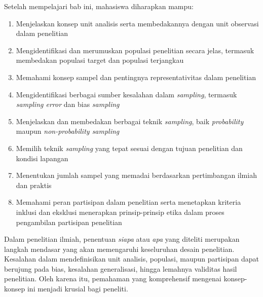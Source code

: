 \documentclass[
  indonesian,
  letterpaper,
  DIV=11,
  numbers=noendperiod]{scrreprt}
\providecommand{\tightlist}{%
  \setlength{\itemsep}{0pt}\setlength{\parskip}{0pt}}
\begin{document}
\begin{tcolorbox}[enhanced jigsaw, colframe=quarto-callout-note-color-frame, toptitle=1mm, breakable, leftrule=.75mm, arc=.35mm, toprule=.15mm, colback=white, colbacktitle=quarto-callout-note-color!10!white, bottomtitle=1mm, bottomrule=.15mm, titlerule=0mm, title=\textcolor{quarto-callout-note-color}{\faInfo}\hspace{0.5em}{Capaian Pembelajaran}, coltitle=black, left=2mm, opacitybacktitle=0.6, opacityback=0, rightrule=.15mm]

Setelah mempelajari bab ini, mahasiswa diharapkan mampu:

\begin{enumerate}
\def\labelenumi{\arabic{enumi}.}
\tightlist
\item
  Menjelaskan konsep unit analisis serta membedakannya dengan unit
  observasi dalam penelitian
\item
  Mengidentifikasi dan merumuskan populasi penelitian secara jelas,
  termasuk membedakan populasi target dan populasi terjangkau
\item
  Memahami konsep sampel dan pentingnya representativitas dalam
  penelitian
\item
  Mengidentifikasi berbagai sumber kesalahan dalam \emph{sampling},
  termasuk \emph{sampling error} dan bias \emph{sampling}
\item
  Menjelaskan dan membedakan berbagai teknik \emph{sampling}, baik
  \emph{probability} maupun \emph{non-probability sampling}
\item
  Memilih teknik \emph{sampling} yang tepat sesuai dengan tujuan
  penelitian dan kondisi lapangan
\item
  Menentukan jumlah sampel yang memadai berdasarkan pertimbangan ilmiah
  dan praktis
\item
  Memahami peran partisipan dalam penelitian serta menetapkan kriteria
  inklusi dan eksklusi menerapkan prinsip-prinsip etika dalam proses
  pengambilan partisipan penelitian
\end{enumerate}

\end{tcolorbox}

Dalam penelitian ilmiah, penentuan \emph{siapa} atau \emph{apa} yang
diteliti merupakan langkah mendasar yang akan memengaruhi keseluruhan
desain penelitian. Kesalahan dalam mendefinisikan unit analisis,
populasi, maupun partisipan dapat berujung pada bias, kesalahan
generalisasi, hingga lemahnya validitas hasil penelitian. Oleh karena
itu, pemahaman yang komprehensif mengenai konsep-konsep ini menjadi
krusial bagi peneliti.
\end{document}

